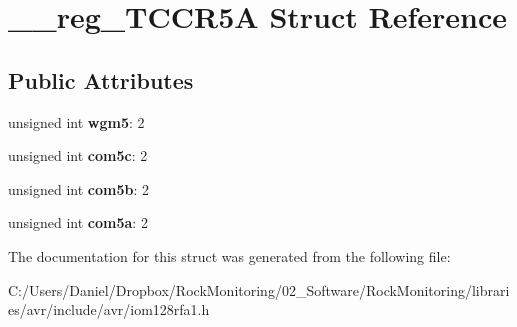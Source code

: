 \hypertarget{struct____reg___t_c_c_r5_a}{}\section{\+\_\+\+\_\+reg\+\_\+\+T\+C\+C\+R5A Struct Reference}
\label{struct____reg___t_c_c_r5_a}
\subsection*{Public Attributes}
\begin{DoxyCompactItemize}
\item 
unsigned int {\bfseries wgm5}\+: 2\hypertarget{struct____reg___t_c_c_r5_a_ae4f4db73afc2ea8dbd2dd2fa59604cff}{}\label{struct____reg___t_c_c_r5_a_ae4f4db73afc2ea8dbd2dd2fa59604cff}

\item 
unsigned int {\bfseries com5c}\+: 2\hypertarget{struct____reg___t_c_c_r5_a_af642e6906496c682b973511de034b74d}{}\label{struct____reg___t_c_c_r5_a_af642e6906496c682b973511de034b74d}

\item 
unsigned int {\bfseries com5b}\+: 2\hypertarget{struct____reg___t_c_c_r5_a_a31a54114b700fa13e0b77201a96ab961}{}\label{struct____reg___t_c_c_r5_a_a31a54114b700fa13e0b77201a96ab961}

\item 
unsigned int {\bfseries com5a}\+: 2\hypertarget{struct____reg___t_c_c_r5_a_a0683fe3f90cb442513753454d5514170}{}\label{struct____reg___t_c_c_r5_a_a0683fe3f90cb442513753454d5514170}

\end{DoxyCompactItemize}


The documentation for this struct was generated from the following file\+:\begin{DoxyCompactItemize}
\item 
C\+:/\+Users/\+Daniel/\+Dropbox/\+Rock\+Monitoring/02\+\_\+\+Software/\+Rock\+Monitoring/libraries/avr/include/avr/iom128rfa1.\+h\end{DoxyCompactItemize}
